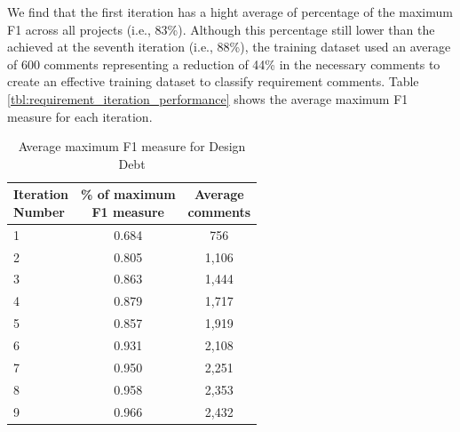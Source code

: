 We find that the first iteration has a hight average of percentage of the maximum F1 across all projects (i.e., 83\%). Although this percentage still lower than the achieved at the seventh iteration (i.e., 88\%), the training dataset used an average of 600 \SATD comments representing a reduction of 44\% in the necessary comments to create an effective training dataset to classify requirement \SATD comments. Table \ref{tbl:requirement_iteration_performance} shows the average maximum F1 measure for each iteration. 

\begin{table}[!thb]
    \begin{center}
        \caption{Average maximum F1 measure for Design Debt}
        \label{tbl:design_iteration_performance}
        \begin{tabular}{l| c c }
        \toprule
        \thead{Iteration\\Number} & \thead{\% of maximum\\F1 measure} & \thead{Average\\comments} \\
        \midrule
         1  &  0.684  & 756   \\  
         2  &  0.805  & 1,106 \\  
         3  &  0.863  & 1,444 \\  
         4  &  0.879  & 1,717 \\  
         5  &  0.857  & 1,919 \\  
         6  &  0.931  & 2,108 \\  
         7  &  0.950  & 2,251 \\  
         8  &  0.958  & 2,353 \\  
         9  &  0.966  & 2,432 \\  
        \bottomrule
        \end{tabular}
    \end{center}    
\end{table}

